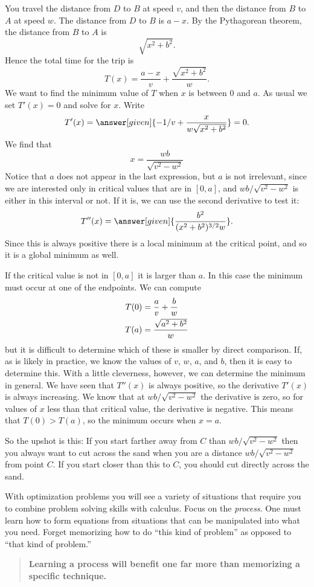 \documentclass{ximera}
\begin{document}
\begin{example}
\begin{explanation}
    You travel the distance from $D$ to $B$ at speed $v$, and then the
    distance from $B$ to $A$ at speed $w$.  The distance from $D$ to $B$
    is $a-x$. By the Pythagorean theorem, the distance from $B$ to $A$
    is
    \[
    \sqrt{x^2+b^2}.
    \] 
Hence the total time for the trip is
\[
T(x)=\frac{a-x}{v}+\frac{\sqrt{x^2+b^2}}{w}.
\]
We want to find the minimum value of $T$ when $x$ is between 0 and
$a$.  As usual we set $T'(x)=0$ and solve for $x$. Write
\[
  T'(x)=\answer[given]{-1/v+\frac{x}{w\sqrt{x^2+b^2}}} =0.
\]
We find that 
\[
x=\frac{wb}{\sqrt{v^2-w^2}}
\]
Notice that $a$ does not appear in the last expression, but $a$ is not
irrelevant, since we are interested only in critical values that are
in $[0,a]$, and $wb/\sqrt{v^2-w^2}$ is either in this interval or not.
If it is, we can use the second derivative to test it:
\[
T''(x) = \answer[given]{\frac{b^2}{(x^2+b^2)^{3/2}w}}.
\]
Since this is always positive there is a local minimum at the critical
point, and so it is a global minimum as well.

If the critical value is not in $[0,a]$ it is larger than $a$. In this
case the minimum must occur at one of the endpoints. We can compute
\begin{align*}
T(0)&={a\over v}+{b\over w} \\
T(a)&={\sqrt{a^2+b^2}\over w} 
\end{align*}
but it is difficult to determine which of these is smaller by direct
comparison. If, as is likely in practice, we know the values of $v$,
$w$, $a$, and $b$, then it is easy to determine this. With a little
cleverness, however, we can determine the minimum in general. We have seen that
$T''(x)$ is always positive, so the derivative $T'(x)$ is always increasing.
We know that at $wb/\sqrt{v^2-w^2}$ the derivative is zero, so for
values of $x$ less than that critical value, the derivative is
negative. This means that $T(0)>T(a)$, so the minimum occurs when $x=a$.

So the upshot is this: If you start farther away from $C$ than
$wb/\sqrt{v^2-w^2}$ then you always want to cut across the sand 
when you are a distance $wb/\sqrt{v^2-w^2}$ from point $C$. If you
start closer than this to $C$, you should cut directly across the sand.
\end{explanation}
\end{example}


With optimization problems you will see a variety of situations that
require you to combine problem solving skills with calculus. Focus on
the \textit{process}.  One must learn how to form equations from
situations that can be manipulated into what you need. Forget
memorizing how to do ``this kind of problem'' as opposed to ``that
kind of problem.''
\begin{quote}
  \textbf{Learning a process will benefit one far more than memorizing
    a specific technique.}
\end{quote}
\end{document}
